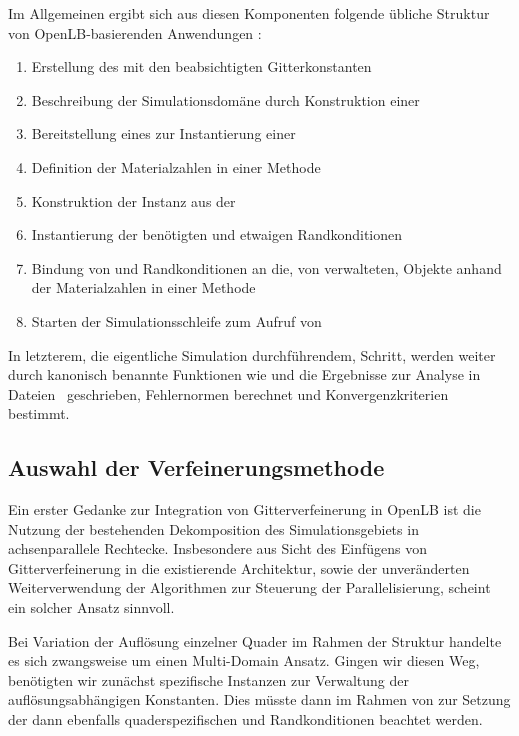 \bigskip
Im Allgemeinen ergibt sich aus diesen Komponenten folgende übliche Struktur von OpenLB-basierenden Anwendungen \cite[Kap.~2.1]{olb12userguide}:
\begin{enumerate}
	\item Erstellung des  mit den beabsichtigten Gitterkonstanten
	\item Beschreibung der Simulationsdomäne durch Konstruktion einer 
	\item Bereitstellung eines  zur Instantierung einer 
	\item Definition der Materialzahlen in einer  Methode
	\item Konstruktion der  Instanz aus der 
	\item Instantierung der benötigten  und etwaigen Randkonditionen
	\item Bindung von  und Randkonditionen an die, von  verwalteten,  Objekte anhand der Materialzahlen in einer  Methode
	\item Starten der Simulationsschleife zum Aufruf von 
\end{enumerate}

In letzterem, die eigentliche Simulation durchführendem, Schritt, werden weiter durch kanonisch benannte Funktionen wie  und  die Ergebnisse zur Analyse in Dateien~\cite{vtkGuide10} geschrieben, Fehlernormen berechnet und Konvergenzkriterien bestimmt.

\subsection{Auswahl der Verfeinerungsmethode}
\label{sec:olbRefinementChoice}

Ein erster Gedanke zur Integration von Gitterverfeinerung in OpenLB ist die Nutzung der bestehenden Dekomposition des Simulationsgebiets in achsenparallele Rechtecke. Insbesondere aus Sicht des Einfügens von Gitterverfeinerung in die existierende Architektur, sowie der unveränderten Weiterverwendung der  Algorithmen zur Steuerung der Parallelisierung, scheint ein solcher Ansatz sinnvoll.

Bei Variation der Auflösung einzelner Quader im Rahmen der  Struktur handelte es sich zwangsweise um einen Multi-Domain Ansatz. Gingen wir diesen Weg, benötigten wir zunächst  spezifische  Instanzen zur Verwaltung der auflösungsabhängigen Konstanten. Dies müsste dann im Rahmen von  zur Setzung der dann ebenfalls quaderspezifischen  und Randkonditionen beachtet werden.

